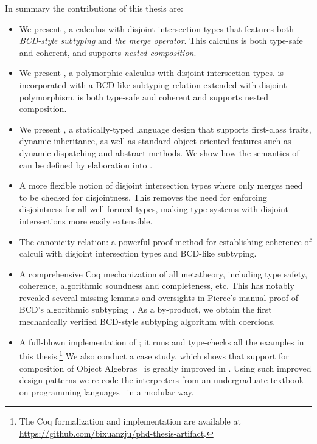 In summary the contributions of this thesis are:

\begin{itemize}

\item We present \namee, a calculus with disjoint intersection types that
  features both \emph{BCD-style subtyping} and \emph{the merge operator}. This
  calculus is both type-safe and coherent, and supports \emph{nested composition}.

\item We present \fnamee, a polymorphic calculus with disjoint intersection
  types. \fnamee is incorporated with a BCD-like subtyping relation extended
  with disjoint polymorphism. \fnamee is both type-safe and coherent and
  supports nested composition.

\item We present \sedel, a statically-typed language design that supports
  first-class traits, dynamic inheritance, as well as standard object-oriented
  features such as dynamic dispatching and abstract methods. We show how the
  semantics of \sedel can be defined by elaboration into \fnamee.

\item A more flexible notion of disjoint intersection types where only merges
  need to be checked for disjointness. This removes the need for enforcing
  disjointness for all well-formed types, making type systems with disjoint
  intersections more easily extensible.

\item The canonicity relation: a powerful proof method for establishing
  coherence of calculi with disjoint intersection types and BCD-like subtyping.

\item A comprehensive Coq mechanization of all metatheory, including type
  safety, coherence, algorithmic soundness and completeness, etc. This has
  notably revealed several missing lemmas and oversights in Pierce's manual
  proof of BCD's algorithmic subtyping~\citep{pierce1989decision}. As a
  by-product, we obtain the first mechanically verified BCD-style subtyping
  algorithm with coercions.

\item A full-blown implementation of \sedel; it runs and type-checks all the
  examples in this thesis.\footnote{The Coq formalization and implementation are
    available at \url{https://github.com/bixuanzju/phd-thesis-artifact}.} We
  also conduct a case study, which shows that support for composition of Object
  Algebras~\citep{oliveira2012extensibility} is greatly improved in \sedel.
  Using such improved design patterns we re-code the interpreters from an
  undergraduate textbook on programming languages~\citep{poplcook} in a modular
  way.

\end{itemize}


